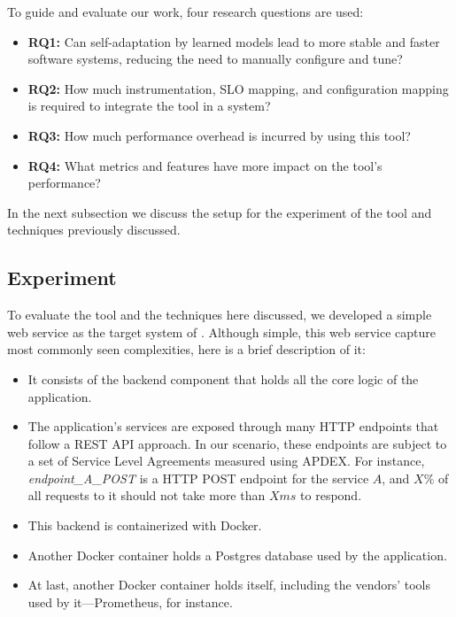 To guide and evaluate our work, four research questions are used:

\begin{itemize}
  \item \textbf{RQ1:} Can self-adaptation by learned models lead to more stable and faster software systems, reducing the need to manually configure and tune?
  \item \textbf{RQ2:} How much instrumentation, SLO mapping, and configuration mapping is required to integrate the tool in a system?
  \item \textbf{RQ3:} How much performance overhead is incurred by using this tool?
  \item \textbf{RQ4:} What metrics and features have more impact on the tool's performance?
\end{itemize}

In the next subsection we discuss the setup for the experiment of the tool and techniques previously discussed.

\subsection{Experiment}

To evaluate the tool and the techniques here discussed, we developed a simple web service as the target system of \projectname{}. Although simple, this web service capture most commonly seen complexities, here is a brief description of it:

\begin{itemize}
  \item It consists of the backend component that holds all the core logic of the application.
  \item The application's services are exposed through many HTTP endpoints that follow a REST API approach. In our scenario, these endpoints are subject to a set of Service Level Agreements measured using APDEX. For instance, \textit{endpoint\_A\_POST} is a HTTP POST endpoint for the service $A$, and $X\%$ of all requests to it should not take more than $X ms$ to respond.
  \item This backend is containerized with Docker.
  \item Another Docker container holds a Postgres database used by the application.
  \item At last, another Docker container holds \projectname{} itself, including the vendors' tools used by it---Prometheus, for instance.
\end{itemize}

